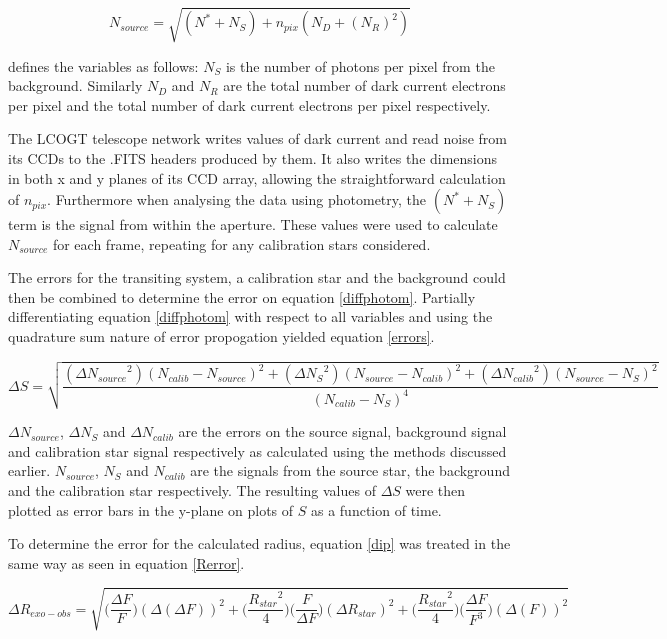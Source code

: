 \documentclass{report}
\begin{document}
\begin{equation} \label{ccd}
    N_{source} = \sqrt{(N^{*}+N_{S})+n_{pix}(N_{D}+(N_{R})^2)}
\end{equation}

\citeauthor{howell} defines the variables as follows: $N_{S}$ is the number of photons per pixel from the background. Similarly $N_{D}$ and $N_{R}$ are the total number of dark current electrons per pixel and the total number of dark current electrons per pixel respectively. 

The LCOGT telescope network writes values of dark current and read noise from its CCDs to the .FITS headers produced by them. It also writes the dimensions in both x and y planes of its CCD array, allowing the straightforward calculation of $n_{pix}$. Furthermore when analysing the data using photometry, the $(N^{*}+N_{S})$ term is the signal from within the aperture. These values were used to calculate $N_{source}$ for each frame, repeating for any calibration stars considered. 

The errors for the transiting system, a calibration star and the background could then be combined to determine the error on equation \ref{diffphotom}. Partially differentiating equation \ref{diffphotom} with respect to all variables and using the quadrature sum nature of error propogation yielded equation \ref{errors}.

\begin{equation} \label{errors}
    {\Delta S} = \sqrt{\frac{({\Delta N_{source}}^{2})(N_{calib}-N_{source})^{2} + ({\Delta N_{S}}^{2})(N_{source}-N_{calib})^2 + ({\Delta N_{calib}}^{2})(N_{source}-N_{S})^2}{(N_{calib}-N_{S})^4}}
\end{equation}

$\Delta N_{source}$, $\Delta N_{S}$ and $\Delta N_{calib}$ are the errors on the source signal, background signal and calibration star signal respectively as calculated using the methods discussed earlier. $N_{source}$, $N_{S}$ and $N_{calib}$ are the signals from the source star, the background and the calibration star respectively. The resulting values of $\Delta S$ were then plotted as error bars in the y-plane on plots of $S$ as a function of time.

To determine the error for the calculated radius, equation \ref{dip} was treated in the same way as seen in equation \ref{Rerror}.

\begin{equation} \label{Rerror}
    \Delta R_{exo-obs} = \sqrt{\Big(\frac{\Delta F}{F}\Big)(\Delta (\Delta F))^2 + \Big(\frac{{R_{star}}^2}{4}\Big)\Big(\frac{F}{\Delta F}\Big)(\Delta {R_{star}})^2 + \Big(\frac{{R_{star}}^2}{4}\Big)\Big(\frac{\Delta F}{F^3}\Big)(\Delta (F))^2}
\end{equation}
\end{document}
